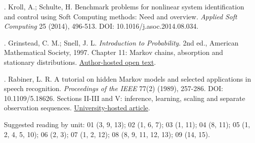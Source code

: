 \documentclass[11pt,a4paper]{article}
\begin{document}
. Kroll, A.; Schulte, H. Benchmark problems for nonlinear system identification and control using Soft Computing methods: Need and overview. \emph{Applied Soft Computing} 25 (2014), 496-513. DOI: 10.1016/j.asoc.2014.08.034.\par\smallskip

. Grinstead, C. M.; Snell, J. L. \emph{Introduction to Probability}. 2nd ed., American Mathematical Society, 1997. Chapter 11: Markov chains, absorption and stationary distributions. \href{https://www.math.dartmouth.edu/~prob/prob/NEW/amsbookwithlinks.mac.pdf}{Author-hosted open text}.\par\smallskip

. Rabiner, L. R. A tutorial on hidden Markov models and selected applications in speech recognition. \emph{Proceedings of the IEEE} 77(2) (1989), 257-286. DOI: 10.1109/5.18626. Sections II-III and V: inference, learning, scaling and separate observation sequences. \href{https://web.mit.edu/6.435/www/Rabiner89.pdf}{University-hosted article}.\par\smallskip

Suggested reading by unit: 01 (3, 9, 13); 02 (1, 6, 7); 03 (1, 11); 04 (8, 11); 05 (1, 2, 4, 5, 10); 06 (2, 3); 07 (1, 2, 12); 08 (8, 9, 11, 12, 13); 09 (14, 15).
\end{document}
